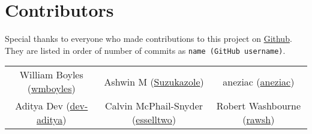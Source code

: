 \section{Contributors}
Special thanks to everyone who made contributions to this project on \href{https://github.com/wmboyles/Math-Summaries}{Github}.
They are listed in order of number of commits as \texttt{name (GitHub username)}.

\begin{center}
    \begin{tabular}{ c c c }
    	William Boyles (\href{https://api.github.com/users/wmboyles}{wmboyles}) & Ashwin M  (\href{https://api.github.com/users/Suzukazole}{Suzukazole}) & aneziac (\href{https://api.github.com/users/aneziac}{aneziac}) \\
		Aditya Dev (\href{https://api.github.com/users/dev-aditya}{dev-aditya}) & Calvin McPhail-Snyder (\href{https://api.github.com/users/esselltwo}{esselltwo}) & Robert Washbourne (\href{https://api.github.com/users/rawsh}{rawsh}) \\
	\end{tabular}
\end{center}
